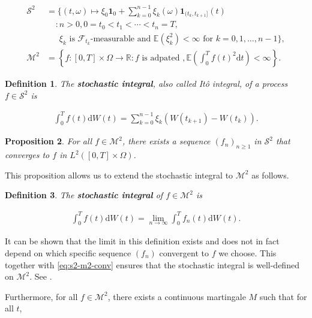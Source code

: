 \documentclass[a4paper]{article}
\newtheorem{definition}{Definition}[section]
\newtheorem{proposition}[definition]{Proposition}
\begin{document}
\begin{align*}
  \mathcal{S}^2 &= \{ (t,\omega) \mapsto \xi_0 \mathbf{1}_0 + \sum_{k=0}^{n-1} \xi_k(\omega) \mathbf{1}_{(t_k,t_{k+1}]}(t)\\
    &\ \ \ \ \ : n > 0, 0 = t_0 < t_1 < \cdots < t_n = T,\\
    &\ \ \ \ \ \ \ \xi_k \text{ is } \mathcal{F}_{t_k}\text{-measurable and } \mathbb{E}(\xi_k^2) < \infty \text{ for } k = 0,1,\ldots,n-1 \},\\
  \mathcal{M}^2 &= \left\{ f : [0,T] \times \Omega \to \mathbb{R} : f \text{ is adpated }, \mathbb{E}\left(\int_0^T f(t)^2 \mathrm{d}t \right) < \infty \right\}.
\end{align*}

\begin{definition}
  The \textbf{stochastic integral}, also called It\^o integral, of a process $f \in \mathcal{S}^2$ is

  \begin{align*}
    \int_0^T f(t) \mathrm{d}W(t) = \sum_{k=0}^{n-1} \xi_k (W(t_{k+1}) - W(t_k)).
  \end{align*}
\end{definition}

\begin{proposition}\label{eq:s2-m2-conv}
  For all $f \in \mathcal{M}^2$, there exists a sequence $(f_n)_{n \ge 1}$ in $\mathcal{S}^2$ that converges to $f$ in $L^2([0,T] \times \Omega)$.
\end{proposition}

This proposition allows us to extend the stochastic integral to $\mathcal{M}^2$ as follows.

\begin{definition}
  The \textbf{stochastic integral} of $f \in \mathcal{M}^2$ is

  \begin{align*}
    \int_0^T f(t) \mathrm{d}W(t) = \lim_{n \to \infty} \int_0^T f_n(t) \mathrm{d}W(t).
  \end{align*}
\end{definition}

It can be shown that the limit in this definition exists and does not in fact depend on which specific sequence $(f_n)$ convergent to $f$ we choose. This together with \eqref{eq:s2-m2-conv} ensures that the stochastic integral is well-defined on $\mathcal{M}^2$. See \textcite{capinski_stochastic_2012}.

Furthermore, for all $f \in \mathcal{M}^2$, there exists a continuous martingale $M$ such that for all $t$,
\end{document}
